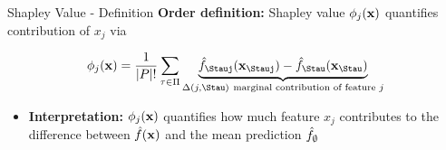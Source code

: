 \documentclass[10pt,compress,t,notes=noshow, xcolor=table]{beamer}
\begin{document}



\begin{frame}{Shapley Value - Definition  }
  \textbf{Order definition:} Shapley value $\phi_j(\mathbf{x})$ quantifies contribution of $x_j$ via

     $$ \phi_j(\xv)  = \frac{1}{|P|!} \sum_{\tau \in \Pi} \underbrace{\fh_{\Stauj}(\xv_{\Stauj}) - \fh_{\Stau}(\xv_{\Stau})}_{\Delta(j, \Stau)~\text{marginal contribution of feature $j$}} $$ %
     
     
\begin{itemize}
  \item \textbf{Interpretation:}  $\phi_j(\mathbf{x})$ quantifies how much feature $x_j$ contributes to the difference between $\hat{f}(\mathbf{x})$ and the mean prediction $\hat{f}_\emptyset$


\end{itemize}
\end{frame}
\end{document}
